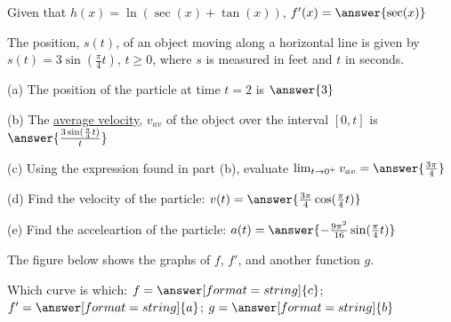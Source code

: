 \documentclass{ximera}
\begin{document}
\begin{exercise}
Given that $h(x)=\ln(\sec(x)+\tan(x))$, $f'(x) = \answer{\sec(x)}$
\end{exercise}


\begin{exercise}
The position, $s(t)$, of an object moving along a horizontal line is given by $s(t)=3\sin\left(\frac{\pi}{4}t\right)$, $t\geq0$, where $s$ is measured in feet and $t$ in seconds.

(a) The position of the particle at time $t=2$ is $\answer{3}$

(b) The \underline{average velocity}, $v_{av}$ of the object over the interval $[0,t]$ is $\answer{\frac{3\sin(\frac{\pi}{4}t)}{t}}$

(c) Using the expression found in part (b), evaluate $\lim_{t\to0^+} v_{av} = \answer{\frac{3\pi}{4}}$

(d) Find the velocity of the particle: $v(t)=\answer{\frac{3\pi}{4}\cos(\frac{\pi}{4}t)}$

(e) Find the acceleartion of the particle: $a(t)=\answer{-\frac{9\pi^2}{16}\sin(\frac{\pi}{4}t)}$

\end{exercise}

\begin{exercise}
The figure below shows the graphs of $f$, $f'$, and another function $g$.
\begin{image}
\end{image}

Which curve is which: $f=\answer[format=string]{c}$; $f'=\answer[format=string]{a}$; $g=\answer[format=string]{b}$
\end{exercise}
\end{document}
